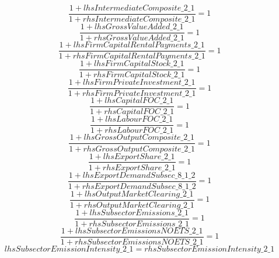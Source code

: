\begin{dmath}
\frac{1+{lhsIntermediateComposite\_2\_1}}{1+{rhsIntermediateComposite\_2\_1}}=1
\end{dmath}
\begin{dmath}
\frac{1+{lhsGrossValueAdded\_2\_1}}{1+{rhsGrossValueAdded\_2\_1}}=1
\end{dmath}
\begin{dmath}
\frac{1+{lhsFirmCapitalRentalPayments\_2\_1}}{1+{rhsFirmCapitalRentalPayments\_2\_1}}=1
\end{dmath}
\begin{dmath}
\frac{1+{lhsFirmCapitalStock\_2\_1}}{1+{rhsFirmCapitalStock\_2\_1}}=1
\end{dmath}
\begin{dmath}
\frac{1+{lhsFirmPrivateInvestment\_2\_1}}{1+{rhsFirmPrivateInvestment\_2\_1}}=1
\end{dmath}
\begin{dmath}
\frac{1+{lhsCapitalFOC\_2\_1}}{1+{rhsCapitalFOC\_2\_1}}=1
\end{dmath}
\begin{dmath}
\frac{1+{lhsLabourFOC\_2\_1}}{1+{rhsLabourFOC\_2\_1}}=1
\end{dmath}
\begin{dmath}
\frac{1+{lhsGrossOutputComposite\_2\_1}}{1+{rhsGrossOutputComposite\_2\_1}}=1
\end{dmath}
\begin{dmath}
\frac{1+{lhsExportShare\_2\_1}}{1+{rhsExportShare\_2\_1}}=1
\end{dmath}
\begin{dmath}
\frac{1+{lhsExportDemandSubsec\_8\_1\_2}}{1+{rhsExportDemandSubsec\_8\_1\_2}}=1
\end{dmath}
\begin{dmath}
\frac{1+{lhsOutputMarketClearing\_2\_1}}{1+{rhsOutputMarketClearing\_2\_1}}=1
\end{dmath}
\begin{dmath}
\frac{1+{lhsSubsectorEmissions\_2\_1}}{1+{rhsSubsectorEmissions\_2\_1}}=1
\end{dmath}
\begin{dmath}
\frac{1+{lhsSubsectorEmissionsNOETS\_2\_1}}{1+{rhsSubsectorEmissionsNOETS\_2\_1}}=1
\end{dmath}
\begin{dmath}
{lhsSubsectorEmissionIntensity\_2\_1}={rhsSubsectorEmissionIntensity\_2\_1}
\end{dmath}
